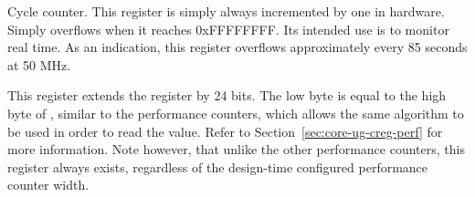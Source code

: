 

Cycle counter. This register is simply always incremented by one in hardware.
Simply overflows when it reaches 0xFFFFFFFF. Its intended use is to monitor
real time. As an indication, this register overflows approximately every 85
seconds at 50 MHz.

\implementation{}


This register extends the  register by 24 bits. The low byte is equal
to the high byte of , similar to the performance counters, which
allows the same algorithm to be used in order to read the value. Refer to
Section~\ref{sec:core-ug-creg-perf} for more information. Note however, that
unlike the other performance counters, this register always exists, regardless
of the design-time configured performance counter width.

\implementation{}
\implementation{}

